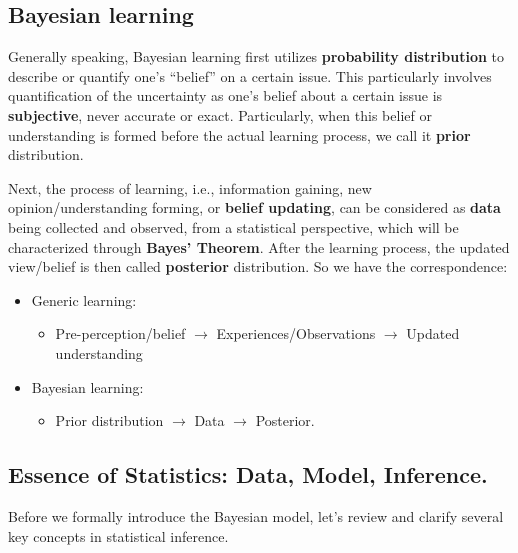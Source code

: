 \documentclass[
]{book}
\providecommand{\tightlist}{%
  \setlength{\itemsep}{0pt}\setlength{\parskip}{0pt}}
\begin{document}
\hypertarget{bayesian-learning-1}{%
\subsection{Bayesian learning}\label{bayesian-learning-1}}

Generally speaking, Bayesian learning first utilizes \textbf{probability distribution} to describe or quantify one's ``belief'' on a certain issue. This particularly involves quantification of the uncertainty as one's belief about a certain issue is \textbf{subjective}, never accurate or exact. Particularly, when this belief or understanding is formed before the actual learning process, we call it \textbf{prior} distribution.

Next, the process of learning, i.e., information gaining, new opinion/understanding forming, or \textbf{belief updating}, can be considered as \textbf{data} being collected and observed, from a statistical perspective, which will be characterized through \textbf{Bayes' Theorem}. After the learning process, the updated view/belief is then called \textbf{posterior} distribution. So we have the correspondence:

\begin{itemize}
\tightlist
\item
  Generic learning:

  \begin{itemize}
  \tightlist
  \item
    Pre-perception/belief \(\rightarrow\) Experiences/Observations \(\rightarrow\) Updated understanding
  \end{itemize}
\item
  Bayesian learning:

  \begin{itemize}
  \tightlist
  \item
    Prior distribution \(\rightarrow\) Data \(\rightarrow\) Posterior.
  \end{itemize}
\end{itemize}

\hypertarget{essence-of-statistics-data-model-inference.}{%
\subsection{Essence of Statistics: Data, Model, Inference.}\label{essence-of-statistics-data-model-inference.}}

Before we formally introduce the Bayesian model, let's review and clarify several key concepts in statistical inference.
\end{document}
